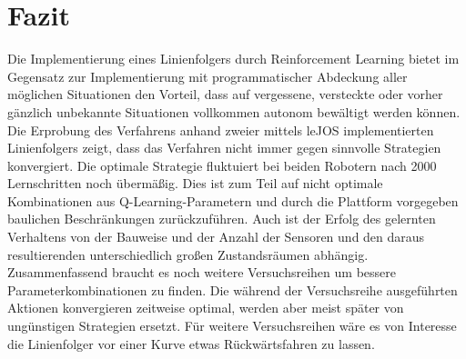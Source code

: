 \chapter{Fazit} %
\label{cha:fazit}

Die Implementierung eines Linienfolgers durch Reinforcement Learning bietet im Gegensatz zur Implementierung mit programmatischer Abdeckung aller möglichen Situationen den Vorteil, dass auf vergessene, versteckte oder vorher gänzlich unbekannte Situationen vollkommen autonom bewältigt werden können. Die Erprobung des Verfahrens anhand zweier mittels leJOS implementierten Linienfolgers zeigt, dass das Verfahren nicht immer gegen sinnvolle Strategien konvergiert. Die optimale Strategie fluktuiert bei beiden Robotern nach 2000 Lernschritten noch übermäßig. Dies ist zum Teil auf nicht optimale Kombinationen aus Q-Learning-Pa\-ra\-metern und durch die Plattform vorgegeben baulichen Beschränkungen zurückzuführen. Auch ist der Erfolg des gelernten Verhaltens von der Bauweise und der Anzahl der Sensoren und den daraus resultierenden unterschiedlich großen Zu\-standsräumen abhängig. Zusammenfassend braucht es noch weitere Versuchsreihen um bessere Parameterkombinationen zu finden. Die während der Versuchsreihe ausgeführten Aktionen konvergieren zeitweise optimal, werden aber meist später von ungünstigen Strategien ersetzt. Für weitere Versuchsreihen wäre es von Interesse die Linienfolger vor einer Kurve etwas Rückwärtsfahren zu lassen.

